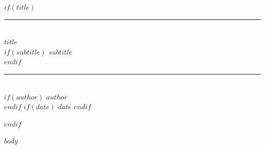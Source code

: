 \documentclass[11pt]{article}
\begin{document}
$if(title)$
\begin{titlepage}
\centering
\vspace*{4cm}
{\color{accent}\rule{\linewidth}{2pt}}\\[0.5cm]
{\Huge\bfseries\color{accent} $title$}\\[0.3cm]
$if(subtitle)$
{\Large\color{textgray} $subtitle$}\\[0.3cm]
$endif$
{\color{accent}\rule{\linewidth}{2pt}}\\[2cm]
$if(author)$
{\Large $author$}\\[0.5cm]
$endif$
$if(date)$
{\large\color{textgray} $date$}
$endif$
\end{titlepage}
\tableofcontents
\newpage
$endif$

$body$
\end{document}
